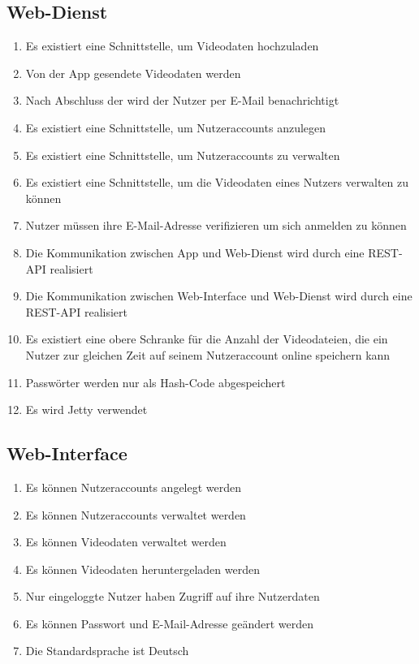 \subsection{Web-Dienst}
	\begin{enumerate}
	\renewcommand{\labelenumi}{\textbf{\theenumi}}
	\renewcommand{\theenumi}{PK\arabic{enumi}0}
	\setcounter{enumi}{199}
	\item Es existiert eine Schnittstelle, um Videodaten hochzuladen
	\item Von der \gls{App} gesendete Videodaten werden 
	\item Nach Abschluss der  wird der Nutzer per \gls{E-Mail} benachrichtigt
	\item Es existiert eine Schnittstelle, um Nutzeraccounts anzulegen
	\item Es existiert eine Schnittstelle, um Nutzeraccounts zu verwalten
	\item Es existiert eine Schnittstelle, um die Videodaten eines Nutzers verwalten zu können
	\item Nutzer müssen ihre \gls{E-Mail}-Adresse verifizieren um sich anmelden zu können
	\item Die Kommunikation zwischen App und Web-Dienst wird durch eine REST-\gls{API} realisiert
	\item Die Kommunikation zwischen \gls{Web-Interface} und \gls{Web-Dienst} wird durch eine REST-\gls{API} realisiert
	\item Es existiert eine obere Schranke für die Anzahl der Videodateien, die ein Nutzer zur gleichen Zeit auf seinem Nutzeraccount online speichern kann
	\item Passwörter werden nur als \gls{Hash-Code} abgespeichert
	\item Es wird Jetty verwendet
	\end{enumerate}
\subsection{Web-Interface}
	\begin{enumerate}
	\renewcommand{\labelenumi}{\textbf{\theenumi}}
	\renewcommand{\theenumi}{PK\arabic{enumi}0}
	\setcounter{enumi}{299}
	\item Es können Nutzeraccounts angelegt werden
	\item Es können Nutzeraccounts verwaltet werden
	\item Es können Videodaten verwaltet werden
	\item Es können Videodaten heruntergeladen werden
	\item Nur eingeloggte Nutzer haben Zugriff auf ihre Nutzerdaten
	\item Es können Passwort und \gls{E-Mail}-Adresse geändert werden
	\item Die Standardsprache ist Deutsch
	\end{enumerate}

